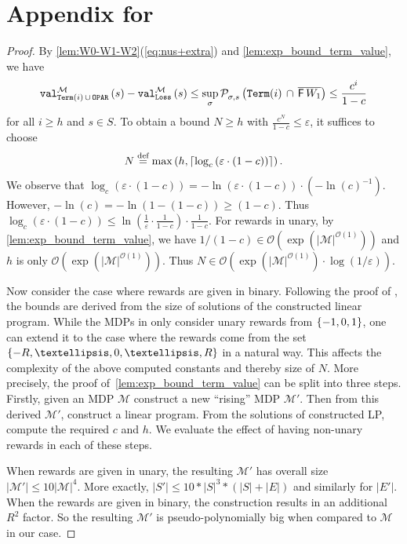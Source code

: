 \documentclass[a4paper,UKenglish,cleveref,autoref,thm-restate]{lipics-v2021}
\DeclareMathOperator{\Term}{\mathtt{Term}}
\DeclareMathOperator{\Loss}{\mathtt{Loss}}
\newcommand{\Oparity}{\mathtt{OPAR}}
\DeclarePairedDelimiter{\set}{\{}{\}}
\DeclarePairedDelimiter{\ceil}{\lceil}{\rceil}
\newcommand{\+}[1]{\mathbb{#1}}
\newcommand{\?}[1]{\mathcal{#1}}
\newcommand{\Ocompl}{\?{O}}
\newcommand{\abs}[1]{\lvert#1\rvert}
\newcommand{\size}[1]{\abs{#1}}
\newcommand{\eqby}[2][=]{\stackrel{\text{{\tiny{#2}}}}{#1}}
\newcommand{\eqdef}{\eqby{def}}
\newcommand{\eps}{\varepsilon}
\newcommand{\Prob}[2][]{\mathcal{P}^{#1}_{#2}}
\newcommand{\eventually}{{\sf F}}
\newcommand{\lrc}[1]{\left(#1\right)}
\newcommand{\mdp}{{\mathcal M}}
\newcommand{\states}{S}
\newcommand{\s}{s}
\newcommand{\transition}{{E}}
\newcommand{\complementof}[1]{\overline{#1}}
\newcommand{\zstrat}{\sigma}
\begin{document}
\section{Appendix for }\label{app:mdp-approx}

\lemMDPN*

\begin{proof}
By \cref{lem:W0-W1-W2}(\cref{eq:nus+extra}) and
\cref{lem:exp_bound_term_value}, we have 
\[
  \valueof[\mdp][\Term(i)\,\cup\, \Oparity]{\s} - \valueof[\mdp][\Loss]{\s} \le  
\sup_{\zstrat}\Prob{\zstrat,\s}\lrc{\Term(i) \, \cap\, \complementof{\eventually\,W_1}} \le
\frac{c^i}{1-c}
\]
for all $i \ge h$ and $\s \in \states$.
To obtain a bound $N \ge h$ with $\frac{c^N}{1-c} \le \eps$, it suffices to choose
\[
  N \eqdef \max\lrc{h,\ceil{\log_c\lrc{\eps \cdot \lrc{1-c}}}}.
\]
We observe that
$\log_c\lrc{\eps \cdot \lrc{1-c}} = -\ln\lrc{\eps \cdot \lrc{1-c}} \cdot (-\ln(c)^{-1})$.\\
However, $-\ln(c) = -\ln(1-(1-c)) \ge (1-c)$.
Thus $\log_c\lrc{\eps \cdot \lrc{1-c}} \le
\ln\lrc{\frac{1}{\eps} \cdot \frac{1}{1-c}} \cdot \frac{1}{1-c}$.
For rewards in unary, by \cref{lem:exp_bound_term_value}, we have 
$1/(1-c) \in {\Ocompl}\left(\exp(\size{\mdp}^{\Ocompl(1)})\right)$ and
$h$ is only ${\Ocompl}(\exp\lrc{\size{\mdp}^{{\Ocompl}(1)}})$.
Thus $N \in {\Ocompl}\left(\exp(\size{\mdp}^{\Ocompl(1)})\cdot \log\lrc{1/\eps}\right)$.

Now consider the case where rewards are given in binary.
Following the proof of \cite[Lemma~3.9]{BBEK:IC2013},
the bounds are derived from the size of solutions of the constructed linear
program. While the MDPs in \cite{BBEK:IC2013} only consider unary rewards
from $\set*{-1,0,1}$,
one can extend it to the case where the rewards come from the set
$\set*{-R,\dots,0,\dots,R}$ in a natural way.
This affects the complexity of the above computed constants and thereby size of $N$.
More precisely, the proof of~\cref{lem:exp_bound_term_value}
can be split into three steps.
Firstly, given an MDP $\mdp$ construct a new ``rising''
MDP $\mdp'$. Then from this derived $\mdp'$,
construct a linear program.
From the solutions of constructed LP,
compute the required $c$ and $h$.
We evaluate the effect of having non-unary rewards in each of these steps.

When rewards are given in unary, the resulting $\mdp'$ has overall size
$\size{\mdp'} \leq 10 \size{\mdp}^4$. More exactly, $\size{\states'} \leq
10*\size{\states}^3*\lrc{\size{\states}+\size{\transition}}$ and similarly for
$\size{\transition'}$. When the rewards are given in binary, the construction results in an additional $R^2$ factor. So the resulting $\mdp'$ is pseudo-polynomially big when compared to $\mdp$ in our case.


\end{proof}
\end{document}
